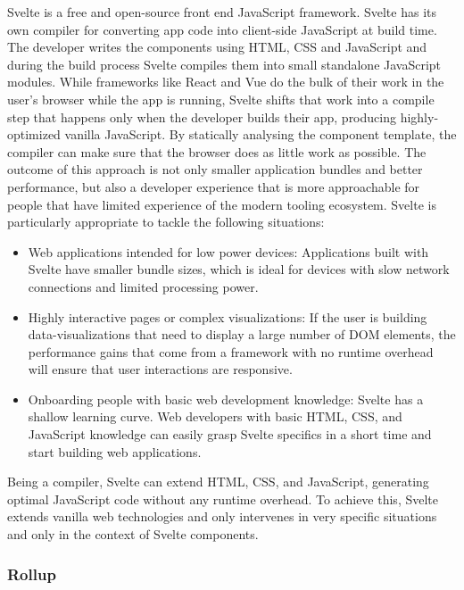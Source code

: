 \documentclass[english,engineering]{wizthesis}
\newcommand{\paraphrase}[1]{#1}
\begin{document}
Svelte \cite{svelte} is a free and open-source front end JavaScript framework.
Svelte has its own compiler for converting app code into client-side JavaScript
at build time. \paraphrase{The developer writes the components using HTML, CSS
and JavaScript and during the build process Svelte compiles them into small
standalone JavaScript modules. While frameworks like React and Vue do the bulk
of their work in the user's browser while the app is running, Svelte shifts that
work into a compile step that happens only when the developer builds their app,
producing highly-optimized vanilla JavaScript. By statically analysing the
component template, the compiler can make sure that the browser does as little
work as possible. The outcome of this approach is not only smaller application
bundles and better performance, but also a developer experience that is more
approachable for people that have limited experience of the modern tooling
ecosystem. Svelte is particularly appropriate to tackle the following
situations:
\begin{itemize}
  \item Web applications intended for low power devices: Applications built with
  Svelte have smaller bundle sizes, which is ideal for devices with slow network
  connections and limited processing power.
  \item Highly interactive pages or complex visualizations: If the user is
  building data-visualizations that need to display a large number of DOM
  elements, the performance gains that come from a framework with no runtime
  overhead will ensure that user interactions are responsive.
  \item Onboarding people with basic web development knowledge: Svelte has a
  shallow learning curve. Web developers with basic HTML, CSS, and JavaScript
  knowledge can easily grasp Svelte specifics in a short time and start building
  web applications.
\end{itemize}

Being a compiler, Svelte can extend HTML, CSS, and JavaScript, generating
optimal JavaScript code without any runtime overhead. To achieve this, Svelte
extends vanilla web technologies and only intervenes in very specific situations
and only in the context of Svelte components.}

\subsubsection*{Rollup}
\end{document}
